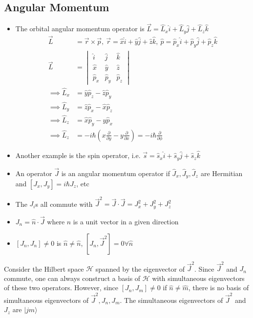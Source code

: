 \documentclass[a4paper,11pt,normalem]{article}
\begin{document}
\subsection{Angular Momentum}\label{angular-momentum}

\begin{itemize}
\item
  The orbital angular momentum operator is
  \(\vec{L} = \hat{L}_{x}\hat{i} + \hat{L}_{y}\hat{j} + \hat{L}_z\hat{k}_{}\)
\[
    \begin{aligned}
    \vec{L} &= \vec{r} \times \vec{p},~ \vec{r} = \hat{x}\hat{i} + \hat{y}\hat{j} + \hat{z}\hat{k},~ \hat{p} = \hat{p}_x\hat{i} + \hat{p}_y\hat{j} + \hat{p}_z\hat{k} \\
    \vec{L} &= \begin{vmatrix} \hat{i} & \hat{j} & \hat{k} \\ \hat{x} & \hat{y} & \hat{z} \\ \hat{p}_x & \hat{p}_y & \hat{p}_z \end{vmatrix} \\
    \implies \hat{L}_x &= \hat{y}\hat{p}_z - \hat{z}\hat{p}_y \\
    \implies \hat{L}_y &= \hat{z}\hat{p}_x - \hat{x}\hat{p}_z \\
    \implies \hat{L}_z &= \hat{x}\hat{p}_y - \hat{y}\hat{p}_x \\
    \implies \hat{L}_z &= -i\hbar\left(x\frac{\partial}{\partial y} - y\frac{\partial}{\partial x}\right) = -i\hbar\frac{\partial}{\partial \phi}
    \end{aligned}
\]
\item
  Another example is the spin operator, i.e.
  \(\vec{s} = \hat{s}_x\hat{i} + \hat{s}_y\hat{j} + \hat{s}_z\hat{k}_{}\)
\item
  An operator \(\vec{J}\) is an angular momentum operator if
  \(\hat{J}_x,\hat{J}_y,\hat{J}_{z_{}}\) are Hermitian and
  \([J_x,J_y] = i\hbar J_z\), etc
\item
  The \(J_i\)s all commute with
  \(\vec{J}^2 = \vec{J}\cdot\vec{J} = J_x^2 + J_y^2 + J_z^2\)
\item
  \(J_n = \hat{n}\cdot\vec{J}\) where \(\hat{n}\) is a unit vector in a
  given direction
\item
  \([J_n,J_n] \neq 0\) is \(\hat{n} \neq \hat{n}\),
  \([J_n,\vec{J}^2] = 0 \forall \hat{n}\)
\end{itemize}

Consider the Hilbert space \(\mathcal{H}\) spanned by the eigenvector of
\(\vec{J}^2\). Since \(\vec{J}^2\) and \(J_n\) commute, one can always
construct a basis of \(\mathcal{H}\) with simultaneous eigenvectors of
these two operators. However, since \([J_n,J_m] \neq 0\) if
\(\hat{n} \neq \hat{m}\), there is no basis of simultaneous eigenvectors
of \(\vec{J}^2, J_n, J_m\). The simultaneous eigenvectors of
\(\vec{J}^2\) and \(J_z\) are \(|jm\rangle\)
\end{document}
